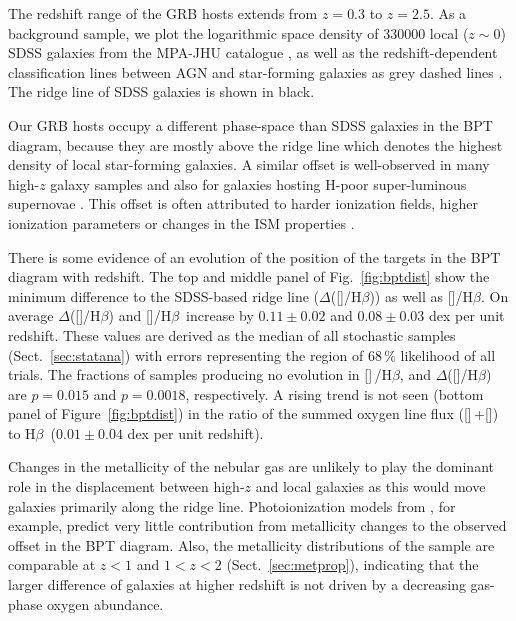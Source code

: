 \documentclass[traditabstract, longauth]{aa}
\newcommand{\hb}{H$\beta$}
\newcommand{\oii}{[\ion{O}{ii}]}
\newcommand{\oiii}{[\ion{O}{iii}]}
\begin{document}
The redshift range of the GRB hosts extends from $z=0.3$ to $z=2.5$. As a background sample, we plot the logarithmic space density of 330000 local ($z\sim0$) SDSS \citep{2009ApJS..182..543A} galaxies from the MPA-JHU catalogue \citep[e.g.,][]{2003MNRAS.346.1055K}, as well as the redshift-dependent classification lines between AGN and star-forming galaxies as grey dashed lines \citep{2013ApJ...774L..10K}. The ridge line of SDSS galaxies \citep{2008MNRAS.385..769B} is shown in black.

Our GRB hosts occupy a different phase-space than SDSS galaxies in the BPT diagram, because they are mostly above the ridge line which denotes the highest density of local star-forming galaxies. A similar offset is well-observed in many high-$z$ galaxy samples \citep[e.g.,][]{2005ApJ...635.1006S, 2007ApJ...669..776K, 2014ApJ...795..165S} and also for galaxies hosting H-poor super-luminous supernovae \citep{2014arXiv1409.8331L}. This offset is often attributed to harder ionization fields, higher ionization parameters or changes in the ISM properties \citep[e.g.,][]{2008MNRAS.385..769B, 2013ApJ...774..100K, 2014ApJ...795..165S}. 

 {There is some evidence of an evolution of the position of the targets in the BPT diagram with redshift. The top and middle panel of Fig.~\ref{fig:bptdist} show the minimum difference to the SDSS-based ridge line ($\Delta$(\oiii/\hb)) as well as \oiii/\hb. On average $\Delta$(\oiii/\hb) and \oiii/\hb\, increase by $0.11\pm0.02$ and $0.08\pm0.03$ dex per unit redshift. These values are derived as the median of all stochastic samples (Sect.~\ref{sec:statana}) with errors representing the region of 68\,\% likelihood of all trials. The fractions of samples producing no evolution in \oiii\,/\hb, and $\Delta$(\oiii/\hb) are $p=0.015$ and $p=0.0018$, respectively. A rising trend is not seen (bottom panel of Figure~\ref{fig:bptdist}) in the ratio of the summed oxygen line flux (\oiii\,+\oii)\,to \hb\, ($0.01\pm0.04$ dex per unit redshift).} 

 {Changes in the metallicity of the nebular gas are unlikely to play the dominant role in the displacement between high-$z$ and local galaxies as this would move galaxies primarily along the ridge line. Photoionization models from \citet{2014ApJ...795..165S}, for example, predict very little contribution from metallicity changes to the observed offset in the BPT diagram. Also, the metallicity distributions of the sample are comparable at $z<1$ and $1<z<2$ (Sect.~\ref{sec:metprop}), indicating that the larger difference of galaxies at higher redshift is not driven by a decreasing gas-phase oxygen abundance.}
\end{document}
